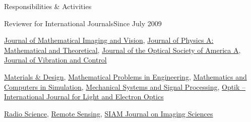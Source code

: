 \documentclass{resume} %
\begin{document}
\begin{rSection}{Responsibilities \& Activities}
\begin{rSubsection}{Reviewer for International Journals}{Since July 2009}{}{}
    \item \href{http://link.springer.com/journal/10851}{Journal of Mathematical Imaging and Vision}, \href{http://iopscience.iop.org/1751-8121}{Journal of Physics A: Mathematical and Theoretical}, \href{https://www.osapublishing.org/josaa/home.cfm}{Journal of the Optical Society of America A}, \href{https://journals.sagepub.com/home/jvc}{Journal of Vibration and Control}
    \item \href{https://www.sciencedirect.com/journal/materials-and-design}{Materials \& Design}, \href{http://www.hindawi.com/journals/mpe/}{Mathematical Problems in Engineering}, \href{https://www.journals.elsevier.com/mathematics-and-computers-in-simulation}{Mathematics and Computers in Simulation}, \href{https://www.journals.elsevier.com/mechanical-systems-and-signal-processing}{Mechanical Systems and Signal Processing}, \href{https://www.journals.elsevier.com/optik}{Optik -- International Journal for Light and Electron Optics}
    \item \href{http://agupubs.onlinelibrary.wiley.com/hub/journal/10.1002/(ISSN)1944-799X/}{Radio Science}, \href{https://www.mdpi.com/journal/remotesensing}{Remote Sensing}, \href{http://www.siam.org/journals/siims.php}{SIAM Journal on Imaging Sciences}

\end{rSubsection}
\end{rSection}
\end{document}
